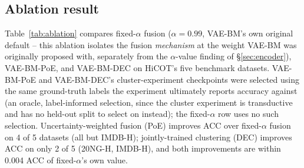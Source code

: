 \documentclass[11pt]{article}
\begin{document}
\subsection{Ablation result}
Table~\ref{tab:ablation} compares fixed-$\alpha$ fusion ($\alpha=0.99$, VAE-BM's own original default -- this ablation isolates the fusion \emph{mechanism} at the weight VAE-BM was originally proposed with, separately from the $\alpha$-value finding of \S\ref{sec:encoder}), VAE-BM-PoE, and VAE-BM-DEC on HiCOT's five benchmark datasets. VAE-BM-PoE and VAE-BM-DEC's cluster-experiment checkpoints were selected using the same ground-truth labels the experiment ultimately reports accuracy against (an oracle, label-informed selection, since the cluster experiment is transductive and has no held-out split to select on instead); the fixed-$\alpha$ row uses no such selection. Uncertainty-weighted fusion (PoE) improves ACC over fixed-$\alpha$ fusion on 4 of 5 datasets (all but IMDB-H); jointly-trained clustering (DEC) improves ACC on only 2 of 5 (20NG-H, IMDB-H), and both improvements are within 0.004 ACC of fixed-$\alpha$'s own value.

\begin{table}[t]
\centering
\small
\caption{Cluster ACC/NMI, HiCOT's five benchmark datasets, \texttt{all-MiniLM-L6-v2} embedder. VAE-BM-PoE and VAE-BM-DEC use oracle-informed checkpoint selection (this appendix, above); the fixed-$\alpha=0.99$ row does not. \textbf{Bold} = best per dataset+metric.}
\label{tab:ablation}
\end{table}
\end{document}
